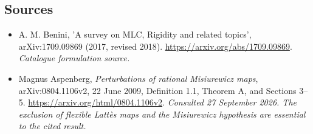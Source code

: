 \documentclass[11pt,a4paper]{article}
\numberwithin{equation}{section}
\begin{document}
\subsection{Sources}
\begin{itemize}\raggedright
\item[\textnormal{[S1]}]\hypertarget{source:statement:1}{} A. M. Benini, 'A survey on MLC, Rigidity and related topics', arXiv:1709.09869 (2017, revised 2018).
\url{https://arxiv.org/abs/1709.09869}.
{\small\textit{Catalogue formulation source.}}
\item[\textnormal{[E1]}]\hypertarget{extra:statement:1}{} Magnus Aspenberg,
\emph{Perturbations of rational Misiurewicz maps}, arXiv:0804.1106v2,
22 June 2009, Definition 1.1, Theorem A, and Sections 3--5.
\url{https://arxiv.org/html/0804.1106v2}.
{\small\textit{Consulted 27 September 2026. The exclusion of flexible
Latt\`es maps and the Misiurewicz hypothesis are essential to the cited result.}}
\end{itemize}
\end{document}
